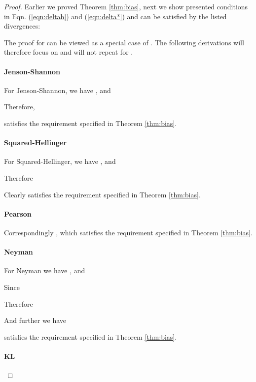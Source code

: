 \documentclass{article}
\begin{document}
\begin{proof}
Earlier we proved Theorem
\ref{thm:bias}, next we show presented conditions in Eqn. (\ref{eqn:deltah}) and (\ref{eqn:delta*}) and  can be satisfied by the listed divergences:


The proof for  can be viewed as a special case of . The following derivations will therefore focus on  and will not repeat for . 

\item


\paragraph{Jenson-Shannon}
For Jenson-Shannon, we have , and 


Therefore,  

 satisfies the requirement specified in Theorem \ref{thm:bias}.



\paragraph{Squared-Hellinger}

For Squared-Hellinger, we have , and 


Therefore 

Clearly  satisfies the requirement specified in Theorem \ref{thm:bias}.

\paragraph{Pearson }




Correspondingly , which satisfies the requirement specified in Theorem \ref{thm:bias}. 
\paragraph{Neyman }
 
For Neyman  we have , and 


Since

Therefore 

And further we have

 satisfies the requirement specified in Theorem \ref{thm:bias}.




\paragraph{KL}


\end{proof}
\end{document}
